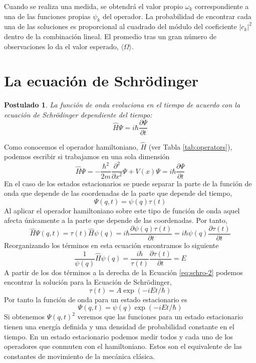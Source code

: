 \documentclass{tufte-handout}
\newtheorem{theorem}{Postulado}
\begin{document}
Cuando se realiza una medida, se obtendrá el valor 
propio $\omega_k$ correspondiente a una de las funciones
propias $\psi_k$ del operador. La probabilidad de
encontrar cada una de las soluciones es proporcional
al cuadrado del módulo  del coeficiente $|c_k|^2$ dentro
de la combinación lineal. El promedio tras un gran número
de observaciones lo da el valor esperado, $\langle
\Omega\rangle$.



\section{La ecuación de Schrödinger}
\begin{theorem}
La función de onda evoluciona en el tiempo de acuerdo 
con la ecuación de Schrödinger dependiente del tiempo:
\begin{equation}
    \hat{H}\Psi = i\hbar\frac{\partial \Psi}{\partial t}
\end{equation}
\end{theorem}
Como conocemos el operador hamiltoniano, $\hat{H}$ (ver
Tabla \ref{tab:operators}), podemos escribir si trabajamos
en una sola dimensión
\begin{equation}
    \hat{H}\Psi = 
      -\frac{\hbar^2}{2m}\frac{\partial^2}{\partial x^2}\Psi + V(x)\Psi = i\hbar\frac{\partial \Psi}{\partial t}
\end{equation}
En el caso de los estados estacionarios 
se puede separar la parte de la función de onda
que depende de las coordenadas de la parte que 
depende del tiempo,
\begin{equation}
    \Psi(q,t)=\psi(q)\tau(t)
\end{equation}
Al aplicar el operador hamiltoniano 
sobre este tipo de función de onda
aquel afecta únicamente a la parte
que depende de las coordenadas. Por
tanto,
\begin{equation}
    \hat{H}\Psi(q,t)=
    \tau(t)\hat{H}\psi(q)=
    i\hbar\frac{\partial\psi(q)\tau(t)}{\partial t}=
    i\hbar\psi(q)\frac{\partial \tau(t)}{\partial t}
\end{equation}
Reorganizando los términos en esta ecuación encontramos
lo siguiente
\begin{equation}
    \frac{1}{\psi(q)}\hat{H}\psi(q) = \frac{i\hbar}{\tau(t)}\frac{\partial \tau(t)}{\partial t}= E
    \label{eq:schro-2}
\end{equation}
A partir de los dos términos a la derecha de la Ecuación
\ref{eq:schro-2} podemos encontrar la solución para la
Ecuación de Schrödinger,
\begin{equation}
    \tau(t)=A\exp(-iEt/\hbar)
\end{equation}
Por tanto la función de onda para un estado estacionario
es
\begin{equation}
    \Psi(q,t)=\psi(q)\exp(-iEt/\hbar)
\end{equation}
Si obtenemos $\Psi(q,t)^2$ veremos que las funciones para un
estado estacionario tienen una energía definida 
y una densidad de probabilidad constante en el tiempo.
En un estado estacionario podemos medir todos y cada uno de los 
operadores que conmuten con el hamiltoniano. Estos son el 
equivalente de las constantes de movimiento de la mecánica clásica.
\end{document}

